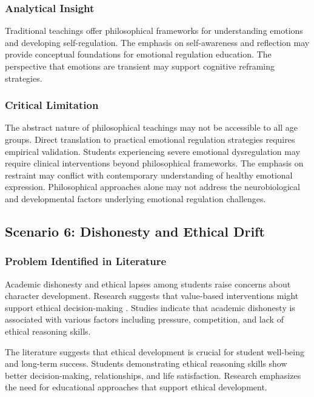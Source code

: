 \documentclass[12pt,a4paper,twocolumn]{article}
\begin{document}
\subsubsection{Analytical Insight}

Traditional teachings offer philosophical frameworks for understanding emotions and developing self-regulation. The emphasis on self-awareness and reflection may provide conceptual foundations for emotional regulation education. The perspective that emotions are transient may support cognitive reframing strategies.

\subsubsection{Critical Limitation}

The abstract nature of philosophical teachings may not be accessible to all age groups. Direct translation to practical emotional regulation strategies requires empirical validation. Students experiencing severe emotional dysregulation may require clinical interventions beyond philosophical frameworks. The emphasis on restraint may conflict with contemporary understanding of healthy emotional expression. Philosophical approaches alone may not address the neurobiological and developmental factors underlying emotional regulation challenges.

\subsection{Scenario 6: Dishonesty and Ethical Drift}

\subsubsection{Problem Identified in Literature}

Academic dishonesty and ethical lapses among students raise concerns about character development. Research suggests that value-based interventions might support ethical decision-making \citep{Pandey2019}. Studies indicate that academic dishonesty is associated with various factors including pressure, competition, and lack of ethical reasoning skills.

The literature suggests that ethical development is crucial for student well-being and long-term success. Students demonstrating ethical reasoning skills show better decision-making, relationships, and life satisfaction. Research emphasizes the need for educational approaches that support ethical development.
\end{document}

